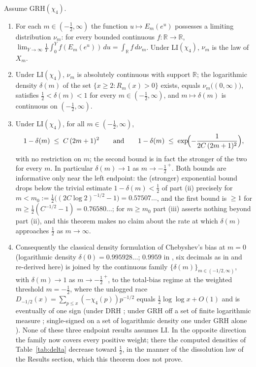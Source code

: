 
\begin{theorem}\label{thm:interp}
Assume GRH$(\chi_4)$.
\begin{enumerate}
\item[(i)] For each $m\in(-\tfrac12,\infty)$ the function
$u\mapsto E_m(e^u)$ possesses a limiting distribution
$\nu_m$: for every bounded continuous $f:\mathbb R\to\mathbb R$,
$\lim_{Y\to\infty}\frac1Y\int_0^Y f(E_m(e^u))\,du
=\int_{\mathbb R}f\,d\nu_m$. Under LI$(\chi_4)$, $\nu_m$ is the law of
$X_m$.
\item[(ii)] Under LI$(\chi_4)$, $\nu_m$ is absolutely continuous with
support $\mathbb R$; the logarithmic density
$\delta(m)$ of the set $\{x\ge2: R_m(x)>0\}$ exists, equals
$\nu_m\bigl((0,\infty)\bigr)$, satisfies
$\tfrac12<\delta(m)<1$ for every $m\in(-\tfrac12,\infty)$, and
$m\mapsto\delta(m)$ is continuous on $(-\tfrac12,\infty)$.
\item[(iii)] Under LI$(\chi_4)$, for all $m\in(-\tfrac12,\infty)$,
\[
1-\delta(m)\;\le\;C\,(2m+1)^2
\qquad\text{and}\qquad
1-\delta(m)\;\le\;\exp\!\Bigl(-\frac{1}{2C\,(2m+1)^2}\Bigr),
\]
with no restriction on $m$; the second bound is in fact the stronger of
the two for every $m$. In particular $\delta(m)\to1$ as
$m\to-\tfrac12^{\,+}$. Both bounds are informative only near the left
endpoint: the (stronger) exponential bound drops below the trivial
estimate $1-\delta(m)<\tfrac12$ of part (ii) precisely for
$m<m_0:=\tfrac12\bigl((2C\log2)^{-1/2}-1\bigr)=0.57507\ldots$, and the
first bound is $\ge1$ for $m\ge\tfrac12(C^{-1/2}-1)=0.76580\ldots$;
for $m\ge m_0$ part (iii) asserts nothing beyond part (ii), and this
theorem makes no claim about the rate at which $\delta(m)$ approaches
$\tfrac12$ as $m\to\infty$.
\item[(iv)] Consequently the classical density formulation of
Chebyshev's bias at $m=0$ (logarithmic density
$\delta(0)=0.995928\ldots$; $0.9959$ in \cite{RS94}, six decimals as in
\cite{FM13} and re-derived here) is joined by the continuous family
$\{\delta(m)\}_{m\in(-1/2,\infty)}$, with $\delta(m)\to1$ as
$m\to-\tfrac12^{\,+}$, to the
total-bias regime at the weighted threshold $m=-\tfrac12$, where the
unlogged race $D_{-1/2}(x)=\sum_{p\le x}(-\chi_4(p))p^{-1/2}$ equals
$\tfrac12\log\log x+O(1)$ and is eventually of one sign (under DRH
\cite{AK23}; under GRH off a set of finite logarithmic measure
\cite{Sheth24}; single-signed on a set of logarithmic density one under
GRH alone \cite{Hay25}). None of these three endpoint results assumes
LI. In the opposite direction the family now covers every positive
weight; there the computed densities of Table~\ref{tab:delta} decrease
toward $\tfrac12$, in the manner of the dissolution law of the Results
section, which this theorem does not prove.
\end{enumerate}
\end{theorem}


